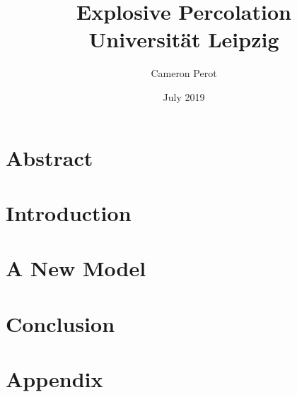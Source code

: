 \documentclass[12pt,twoside]{report}
\title{
    {Explosive Percolation}\\
    {\large Universität Leipzig}
    }
\author{Cameron Perot}
\date{July 2019}
\begin{document}
\maketitle
{}

\chapter*{Abstract}

\tableofcontents
\cleardoublepage
{}

\chapter{Introduction}


\chapter{A New Model}


\chapter{Conclusion}


\appendix
\chapter{Appendix}


\printbibliography
\end{document}
